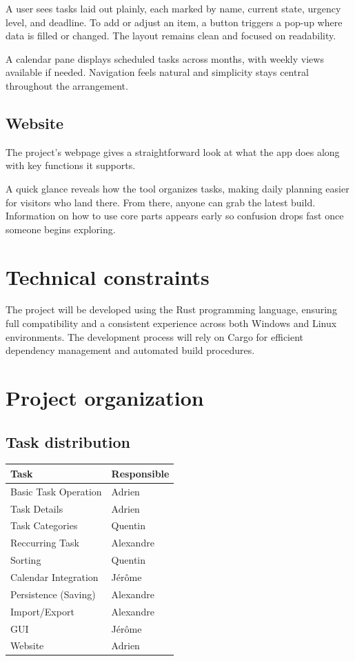 \documentclass{article}
\begin{document}
A user sees tasks laid out plainly, each marked by name, current state, urgency level, and deadline. To add or adjust an item, a button triggers a pop-up where data is filled or changed. The layout remains clean and focused on readability.

A calendar pane displays scheduled tasks across months, with weekly views available if needed. Navigation feels natural and simplicity stays central throughout the arrangement.

\subsection{Website}
The project's webpage gives a straightforward look at what the app does along with key functions it supports.

A quick glance reveals how the tool organizes tasks, making daily planning easier for visitors who land there. From there, anyone can grab the latest build. Information on how to use core parts appears early so confusion drops fast once someone begins exploring.

\section{Technical constraints}

The project will be developed using the Rust programming language, ensuring full compatibility and a consistent experience across both Windows and Linux environments. The development process will rely on Cargo for efficient dependency management and automated build procedures.

\section{Project organization}
\subsection{Task distribution}
\begin{table}[h!]
    \centering
    \begin{tabular}{|l|l|}
        \hline
        \textbf{Task} & \textbf{Responsible}\\
        \hline
        Basic Task Operation & Adrien\\
        \hline
        Task Details & Adrien\\
        \hline
        Task Categories & Quentin\\
        \hline
        Reccurring Task & Alexandre\\
        \hline
        Sorting & Quentin\\
        \hline
        Calendar Integration & Jérôme\\
        \hline
        Persistence (Saving) & Alexandre\\
        \hline
        Import/Export & Alexandre\\
        \hline
        GUI & Jérôme\\
        \hline
        Website & Adrien\\
        \hline
    \end{tabular}
\end{table}
\end{document}
